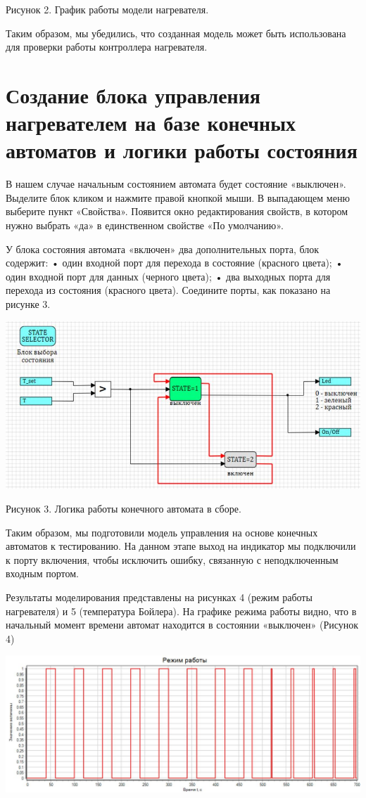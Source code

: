 \documentclass{article}
\begin{document}
\caption{Рисунок 2. График работы модели нагревателя.}

Таким образом, мы убедились, что созданная модель может быть
использована для проверки работы контроллера нагревателя.

\section{Создание блока управления нагревателем на базе конечных
автоматов и логики работы состояния}

В нашем случае начальным состоянием автомата будет состояние «выключен». Выделите блок кликом и нажмите правой кнопкой мыши. В выпадающем меню выберите пункт «Свойства». Появится окно редактирования свойств, в котором нужно выбрать «да» в единственном свойстве «По умолчанию».

У блока состояния автомата «включен» два дополнительных порта, блок содержит:
• один входной порт для перехода в состояние (красного цвета);
• один входной порт для данных (черного цвета);
• два выходных порта для перехода из состояния (красного цвета).
Соедините порты, как показано на рисунке 3.

\includegraphics[width=0.75\linewidth]{view_4.JPG}

\caption{Рисунок 3. Логика работы конечного автомата в сборе.}

Таким образом, мы подготовили модель управления на основе конечных автоматов к тестированию. На данном этапе выход на индикатор мы подключили к порту включения, чтобы исключить ошибку, связанную с неподключенным входным портом. 

Результаты моделирования представлены на рисунках 4 (режим работы нагревателя) и 5 (температура Бойлера). На графике режима работы видно, что в начальный момент времени автомат находится в состоянии «выключен» (Рисунок 4)

\includegraphics[width=0.9\linewidth]{view_5.JPG}
\end{document}
